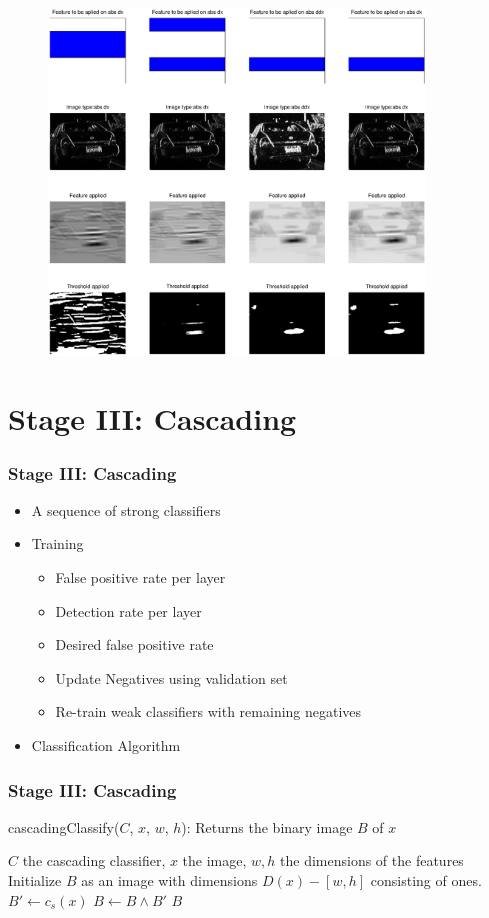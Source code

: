 \documentclass{beamer}
\begin{document}
\frame
{
	\begin{figure}[!ht]
	\centering
	\includegraphics[width=10cm]{../report/img/strongClassifier_layer2_img14}
	\label{fig:strongclassify}
	\end{figure}
}

\section{Stage III: Cascading}
\frame
{
  \frametitle{Stage III: Cascading}
	
  \begin{itemize}
  \item <+-| alert@+> A sequence of strong classifiers
  \item <+-| alert@+> Training
  \begin{itemize}
  	\item False positive rate per layer
  	\item Detection rate per layer
  	\item Desired false positive rate
  	\item Update Negatives using validation set
  	\item Re-train weak classifiers with remaining negatives
  \end{itemize}
  \item <+-| alert@+> Classification Algorithm
  \end{itemize}
}

\frame
{
  \frametitle{Stage III: Cascading}
  \begin{algorithm}[H]
  	\caption{cascadingClassify($C$, $x$, $w$, $h$): Returns the binary image $B$ of $x$}
  	\begin{algorithmic}[1]
  	\REQUIRE $C$ the cascading classifier, $x$ the image, $w,h$ the dimensions of the features
  	\medskip
  	\STATE Initialize $B$ as an image with dimensions $D(x) - [w,h]$ consisting of ones.
  		\STATE $B' \leftarrow c_s(x)$
  		\STATE $B \leftarrow B \land B'$
  	\ENDFOR
  	\RETURN $B$
  	\end{algorithmic}
  \label{alg:casc}
  \end{algorithm}
}
\end{document}
